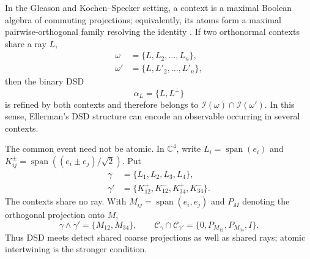 \documentclass[aps,pra,reprint,nofootinbib]{revtex4-2}
\newcommand{\Span}{\operatorname{span}}
\begin{document}
In the Gleason and Kochen--Specker setting, a context is a maximal Boolean
algebra of commuting projections; equivalently, its atoms form a maximal
pairwise-orthogonal family resolving the identity
\cite{Gleason,kochen1}.  If two orthonormal contexts share a ray $L$,
\begin{align}
  \omega&=\{L,L_2,\ldots,L_n\},\\
  \omega'&=\{L,L'_2,\ldots,L'_n\},
\end{align}
then the binary DSD
\begin{equation}
  \alpha_L=\{L,L^\perp\}
  \label{eq:shared-dsd}
\end{equation}
is refined by both contexts and therefore belongs to
$\mathcal I(\omega)\cap\mathcal I(\omega')$.  In this sense, Ellerman's DSD structure
can encode an observable occurring in several contexts.

The common event need not be atomic.  In $\mathbb C^4$, write
$L_i=\Span(e_i)$ and
$K_{ij}^{\pm}=\Span((e_i\pm e_j)/\sqrt2)$.  Put
\begin{align}
  \gamma&=\{L_1,L_2,L_3,L_4\},\nonumber\\
  \gamma'&=\{K_{12}^{+},K_{12}^{-},K_{34}^{+},K_{34}^{-}\}.
  \label{eq:shared-projection-no-ray}
\end{align}
The contexts share no ray.  With $M_{ij}=\Span(e_i,e_j)$ and $P_M$ denoting
the orthogonal projection onto $M$,
\begin{equation}
  \gamma\wedge\gamma'=\{M_{12},M_{34}\},
  \qquad
  \mathcal C_\gamma\cap\mathcal C_{\gamma'}
  =\{0,P_{M_{12}},P_{M_{34}},I\}.
  \label{eq:coarse-projection-overlap}
\end{equation}
Thus DSD meets detect shared coarse projections as well as shared rays;
atomic intertwining is the stronger condition.
\end{document}

